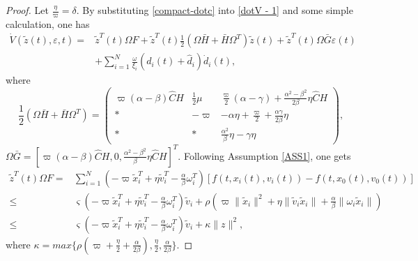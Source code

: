 \documentclass[review]{elsarticle}
\begin{document}
\begin{proof}
	Let $\frac{\eta}{\varpi} = \delta $. By substituting \eqref{compact-dotc} into \eqref{dotV - 1} and some simple calculation, one has 
	\begin{equation}\label{dotV - 2}
	\begin{split}
	\dot V(\tilde z(t) ,\varepsilon, t) 
=	
	&\tilde{z}^T(t) \Omega F +\tilde{z}^T(t) \frac{1}{2}\left(\Omega \bar{H}+ \bar{H}\Omega^T \right) \tilde{z}(t)+ \tilde{z}^T(t) \Omega \bar{G} \varepsilon(t)\\
	& + \sum_{i=1}^{N} \frac{\omega}{\xi_i}(d_i (t) + \hat d_i) \dot d_i (t), 
	\end{split}
	\end{equation}
	where 
	\begin{equation*}
	\frac{1}{2}\left(\Omega \bar{H}+ \bar{H}\Omega^T \right) = \begin{pmatrix}
	\varpi( \alpha- \beta ) \hat  C H   & \frac{1}{2}\mu &	\frac{\varpi }{2}(\alpha-\gamma)+\frac{\alpha^2-\beta^2}{2\beta}\eta \hat C H  \\
	*								& -\varpi&-\alpha \eta+\frac{\varpi}{2}+ \frac{\alpha\gamma}{2\beta}\eta\\
	*& *& \frac{\alpha^2 }{\beta}\eta - \gamma\eta
	\end{pmatrix},
	\end{equation*}
	$\Omega\bar{G}=
	\left[ \varpi(\alpha - \beta) \hat C H ,0,\frac{\alpha^2-\beta^2}{\beta}\eta \hat C H \right] ^T$. 
	Following Assumption \ref{ASS1}, one gets
	\begin{equation}\label{OF}
	\begin{split}
	\tilde{z}^T(t) \Omega F = 		&\sum_{i=1}^{N}\left( -\varpi \tilde{x}_i^T + \eta \tilde{v}_i^T - \frac{\alpha}{\beta} \omega_i^T  \right) \left[ f\left(t,x_i(t),v_i(t) \right)  - f\left(t,x_0(t),v_0(t) \right)\right] \\
	\leq	& \varsigma\left( -\varpi \tilde{x}_i^T + \eta \tilde{v}_i^T -\frac{\alpha}{\beta}\omega_i^T\right)\tilde{v}_i  +\rho \left(\varpi \|\tilde{x}_i\|^2+ \eta\|\tilde{v}_i\tilde{x}_i\|+\frac{\alpha}{\beta}\|\omega_i\tilde{x }_i\|\right)  \\
	\leq	&\varsigma\left( -\varpi \tilde{x}_i^T + \eta \tilde{v}_i^T -\frac{\alpha}{\beta}\omega_i^T\right)\tilde{v}_i +\kappa\|z\|^2,
	\end{split}
	\end{equation}
	where $\kappa = max\{\rho (\varpi+\frac{\eta}{2}+\frac{\alpha}{2\beta}), \frac{\eta}{2}, \frac{\alpha}{2\beta}\}$.
	
	
	

\end{proof}
\end{document}
